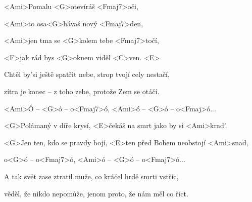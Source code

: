 

\zs
<Ami>Pomalu <G>otevíráš <Fmaj7>oči,

<Ami>to osa<G>hávaš nový <Fmaj7>den,

<Ami>jen tma se <G>kolem tebe <Fmaj7>točí,

<F>jak rád bys <G>oknem viděl <C>ven. <E>
\ks

\zs
Chtěl by'si ještě spatřit nebe, strop tvojí cely nestačí,

zítra je konec -- z toho zebe, protože Zem se otáčí.
\ks

\zr
<Ami>Ó -- <G>ó -- o<Fmaj7>ó, <Ami>ó -- <G>ó -- o<Fmaj>ó...

<G>Polámaný v díře krysí, <E>čekáš na smrt jako by si <Ami>krad'.

<G>Jen ten, kdo se pravdy bojí, <E>ten před Bohem neobstojí <Ami>snad,

o<G>ó -- o<Fmaj7>ó, <Ami>ó -- <G>ó -- o<Fmaj7>ó...
\kr

\zs
A tak svět zase ztratil muže, co kráčel hrdě smrti vstříc,

věděl, že nikdo nepomůže, jenom proto, že nám měl co říct.
\ks

\zr\kr

\kp
